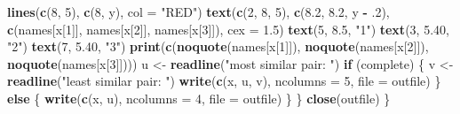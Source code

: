 \documentclass[
  12pt,
]{article}
\newenvironment{Shaded}{\begin{snugshade}}{\end{snugshade}}
\newcommand{\AttributeTok}[1]{\textcolor[rgb]{0.13,0.29,0.53}{#1}}
\newcommand{\ControlFlowTok}[1]{\textcolor[rgb]{0.13,0.29,0.53}{\textbf{#1}}}
\newcommand{\DecValTok}[1]{\textcolor[rgb]{0.00,0.00,0.81}{#1}}
\newcommand{\FloatTok}[1]{\textcolor[rgb]{0.00,0.00,0.81}{#1}}
\newcommand{\FunctionTok}[1]{\textcolor[rgb]{0.13,0.29,0.53}{\textbf{#1}}}
\newcommand{\NormalTok}[1]{#1}
\newcommand{\OtherTok}[1]{\textcolor[rgb]{0.56,0.35,0.01}{#1}}
\newcommand{\SpecialCharTok}[1]{\textcolor[rgb]{0.81,0.36,0.00}{\textbf{#1}}}
\newcommand{\StringTok}[1]{\textcolor[rgb]{0.31,0.60,0.02}{#1}}
\begin{document}
\begin{Shaded}
\begin{Highlighting}[]
    \FunctionTok{lines}\NormalTok{(}\FunctionTok{c}\NormalTok{(}\DecValTok{8}\NormalTok{, }\DecValTok{5}\NormalTok{), }\FunctionTok{c}\NormalTok{(}\DecValTok{8}\NormalTok{, y), }\AttributeTok{col =} \StringTok{"RED"}\NormalTok{)}
    \FunctionTok{text}\NormalTok{(}\FunctionTok{c}\NormalTok{(}\DecValTok{2}\NormalTok{, }\DecValTok{8}\NormalTok{, }\DecValTok{5}\NormalTok{), }\FunctionTok{c}\NormalTok{(}\FloatTok{8.2}\NormalTok{, }\FloatTok{8.2}\NormalTok{, y }\SpecialCharTok{{-}}\NormalTok{ .}\DecValTok{2}\NormalTok{),}
         \FunctionTok{c}\NormalTok{(names[x[}\DecValTok{1}\NormalTok{]], names[x[}\DecValTok{2}\NormalTok{]], names[x[}\DecValTok{3}\NormalTok{]]), }\AttributeTok{cex =} \FloatTok{1.5}\NormalTok{)}
    \FunctionTok{text}\NormalTok{(}\DecValTok{5}\NormalTok{, }\FloatTok{8.5}\NormalTok{, }\StringTok{"1"}\NormalTok{)}
    \FunctionTok{text}\NormalTok{(}\DecValTok{3}\NormalTok{, }\FloatTok{5.40}\NormalTok{, }\StringTok{"2"}\NormalTok{)}
    \FunctionTok{text}\NormalTok{(}\DecValTok{7}\NormalTok{, }\FloatTok{5.40}\NormalTok{, }\StringTok{"3"}\NormalTok{)}
    \FunctionTok{print}\NormalTok{(}\FunctionTok{c}\NormalTok{(}\FunctionTok{noquote}\NormalTok{(names[x[}\DecValTok{1}\NormalTok{]]), }\FunctionTok{noquote}\NormalTok{(names[x[}\DecValTok{2}\NormalTok{]]), }\FunctionTok{noquote}\NormalTok{(names[x[}\DecValTok{3}\NormalTok{]])))}
\NormalTok{    u }\OtherTok{\textless{}{-}} \FunctionTok{readline}\NormalTok{(}\StringTok{"most similar pair: "}\NormalTok{)}
    \ControlFlowTok{if}\NormalTok{ (complete) \{}
\NormalTok{      v }\OtherTok{\textless{}{-}} \FunctionTok{readline}\NormalTok{(}\StringTok{"least similar pair: "}\NormalTok{)}
      \FunctionTok{write}\NormalTok{(}\FunctionTok{c}\NormalTok{(x, u, v), }\AttributeTok{ncolumns =} \DecValTok{5}\NormalTok{, }\AttributeTok{file =}\NormalTok{ outfile)}
\NormalTok{    \} }\ControlFlowTok{else}\NormalTok{ \{}
      \FunctionTok{write}\NormalTok{(}\FunctionTok{c}\NormalTok{(x, u), }\AttributeTok{ncolumns =} \DecValTok{4}\NormalTok{, }\AttributeTok{file =}\NormalTok{ outfile)}
\NormalTok{    \}}
\NormalTok{  \}}
  \FunctionTok{close}\NormalTok{(outfile)}
\NormalTok{\}}


\end{Highlighting}
\end{Shaded}
\end{document}
